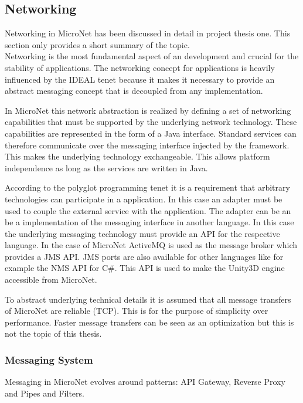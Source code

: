 \subsection{Networking}
\label{sub:networking}
Networking in MicroNet has been discussed in detail in project thesis one. This
section only provides a short summary of the topic.\\

Networking is the most fundamental aspect of an \og{} development and crucial
for the stability of \ms{} applications. The networking concept for \ms{}
applications is heavily influenced by the IDEAL tenet because it makes it
necessary to provide an abstract messaging concept that is decoupled from any
implementation.

In MicroNet this network abstraction is realized by defining a set of networking
capabilities that must be supported by the underlying network technology. These
capabilities are represented in the form of a Java interface. Standard services
can therefore communicate over the messaging interface injected by the
framework. This makes the underlying technology exchangeable. This allows
platform independence as long as the services are written in Java.

According to the polyglot programming tenet it is a requirement that arbitrary
technologies can participate in a \ms{} application. In this case an adapter
must be used to couple the external service with the application. The adapter
can be an be a implementation of the messaging interface in another language. In
this case the underlying messaging technology must provide an API for the
respective language. In the case of MicroNet ActiveMQ is used as the
message broker which provides a JMS API. JMS ports are also available for other
languages like for example the NMS API for C\#. This API is used to make the
Unity3D engine accessible from MicroNet.

To abstract underlying technical details it is assumed that all message
transfers of MicroNet are reliable (TCP). This is for the purpose of simplicity
over performance. Faster message transfers can be seen as an optimization but
this is not the topic of this thesis.

\subsubsection{Messaging System}

Messaging in MicroNet evolves around patterns: API Gateway, Reverse Proxy and
Pipes and Filters.\\

